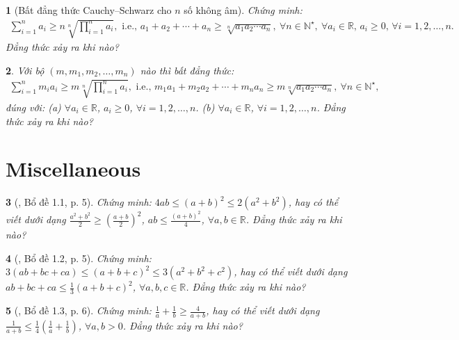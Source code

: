 \documentclass{article}
\newtheorem{baitoan}{}
\begin{document}
\begin{baitoan}[Bất đẳng thức Cauchy--Schwarz cho $n$ số không âm]
	Chứng minh:
	\begin{align*}
		\sum_{i=1}^n a_i\ge n\sqrt[n]{\prod_{i=1}^n a_i},\mbox{ i.e., } a_1 + a_2 + \cdots + a_n\ge\sqrt[n]{a_1a_2\cdots a_n},\ \forall n\in\mathbb{N}^\star,\ \forall a_i\in\mathbb{R},\,a_i\ge0,\,\forall i = 1,2,\ldots,n.
	\end{align*}
	Đẳng thức xảy ra khi nào?
\end{baitoan}

\begin{baitoan}
	Với bộ $(m,m_1,m_2,\ldots,m_n)$ nào thì bất đẳng thức:
	\begin{align*}
		\sum_{i=1}^n m_ia_i\ge m\sqrt[n]{\prod_{i=1}^n a_i},\mbox{ i.e., } m_1a_1 + m_2a_2 + \cdots + m_na_n\ge m\sqrt[n]{a_1a_2\cdots a_n},\ \forall n\in\mathbb{N}^\star,
	\end{align*}
	đúng với: (a) $\forall a_i\in\mathbb{R}$, $a_i\ge0$, $\forall i = 1,2,\ldots,n$. (b) $\forall a_i\in\mathbb{R}$, $\forall i = 1,2,\ldots,n$.
	Đẳng thức xảy ra khi nào?
\end{baitoan}



\section{Miscellaneous}

\begin{baitoan}[\cite{Son_Nghiep_Trung_Can_bdt}, Bổ đề 1.1, p. 5]
	Chứng minh: $4ab\le(a + b)^2\le2(a^2 + b^2)$, hay có thể viết dưới dạng $\frac{a^2 + b^2}{2}\ge\left(\frac{a + b}{2}\right)^2$, $ab\le\frac{(a + b)^2}{4}$, $\forall a,b\in\mathbb{R}$. Đẳng thức xảy ra khi nào?
\end{baitoan}

\begin{baitoan}[\cite{Son_Nghiep_Trung_Can_bdt}, Bổ đề 1.2, p. 5]
	Chứng minh: $3(ab + bc + ca)\le(a + b + c)^2\le3(a^2 + b^2 + c^2)$, hay có thể viết dưới dạng $ab + bc + ca\le\frac{1}{3}(a + b + c)^2$, $\forall a,b,c\in\mathbb{R}$. Đẳng thức xảy ra khi nào?
\end{baitoan}

\begin{baitoan}[\cite{Son_Nghiep_Trung_Can_bdt}, Bổ đề 1.3, p. 6]
	Chứng minh: $\frac{1}{a} + \frac{1}{b}\ge\frac{4}{a + b}$, hay có thể viết dưới dạng $\frac{1}{a + b}\le\frac{1}{4}\left(\frac{1}{a} + \frac{1}{b}\right)$, $\forall a,b > 0$. Đẳng thức xảy ra khi nào?
\end{baitoan}
\end{document}
